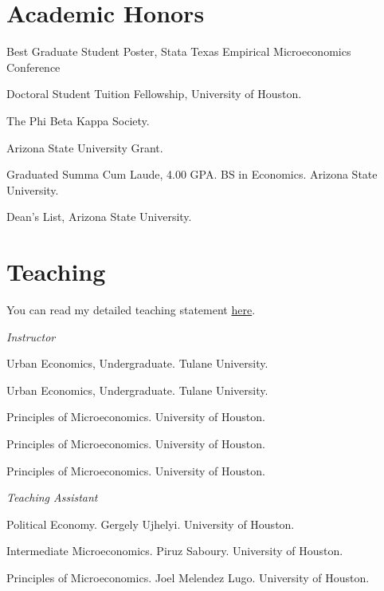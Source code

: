 \documentclass[letterpaper]{article}
\renewenvironment{itemize}{
  \begin{list}{}{
    \setlength{\leftmargin}{1.5em}
  }
}{
  \end{list}
}
\begin{document}
\vspace{2 mm}

\section*{Academic Honors}
\vspace{2 mm}
\begin{itemize}
\item {} Best Graduate Student Poster, Stata Texas Empirical Microeconomics Conference
\item {} Doctoral Student Tuition Fellowship, University of Houston. 
\item {} The Phi Beta Kappa Society. 
\item {} Arizona State University Grant. 
\item {} Graduated Summa Cum Laude, 4.00 GPA. BS in Economics. Arizona State University. 
\item {} Dean's List, Arizona State University. 
\end{itemize}
\vspace{2 mm}

\section*{Teaching}
\vspace{2 mm}

You can read my detailed teaching statement \href{https://hhadah.github.io/statements/Hadah_Teaching.pdf}{here}.

\textit{Instructor}
\begin{itemize}
\item {}Urban Economics, Undergraduate. Tulane University.
\item {}Urban Economics, Undergraduate. Tulane University.
\item {}Principles of Microeconomics. University of Houston.
\item {}Principles of Microeconomics. University of Houston.
\item {}Principles of Microeconomics. University of Houston.

\end{itemize}
\textit{Teaching Assistant}
\begin{itemize}
\item {}Political Economy. Gergely Ujhelyi. University of Houston.
\item {}Intermediate Microeconomics. Piruz Saboury. University of Houston.
\item {}Principles of Microeconomics. Joel Melendez Lugo. University of Houston.

\end{itemize}
\vspace{2 mm}
\studentnote
\end{document}
